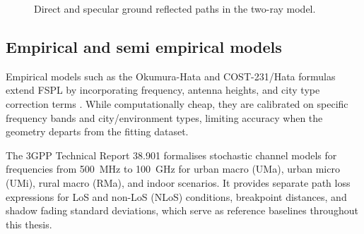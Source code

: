 \begin{figure}[ht]
  \centering
  \caption{Direct and specular ground reflected paths in the two-ray model.}
  \label{fig:two_ray_schematic}
\end{figure}

\subsection{Empirical and semi empirical models}

Empirical models such as the Okumura-Hata and COST-231/Hata formulas extend
FSPL by incorporating frequency, antenna heights, and city type correction terms
\cite{rappaport,cost231}.  While computationally cheap, they are calibrated on specific
frequency bands and city/environment types, limiting accuracy when the geometry
departs from the fitting dataset.

The 3GPP Technical Report 38.901 \cite{tr38901} formalises stochastic channel
models for frequencies from 500~MHz to 100~GHz for urban macro (UMa), urban
micro (UMi), rural macro (RMa), and indoor scenarios.  It provides separate
path loss expressions for LoS and non-LoS (NLoS) conditions, breakpoint
distances, and shadow fading standard deviations, which serve as reference
baselines throughout this thesis.

